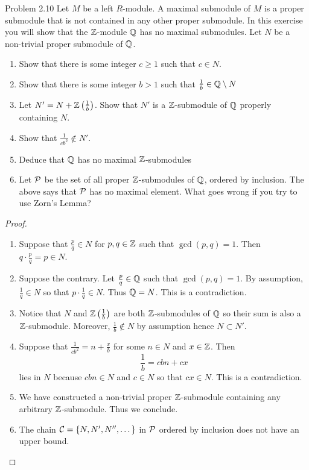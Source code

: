 \documentclass[a4paper]{article}
\begin{document}
\begin{ex}{Problem 2.10}{} Let $M$ be a left $R$-module. A maximal submodule of $M$ is a proper submodule that is not contained in any other proper submodule. In this exercise you will show that the $\mathbb{Z}$-module $\mathbb{Q}$ has no maximal submodules. Let $N$ be a non-trivial proper submodule of $\mathbb{Q}$. 
\begin{enumerate}
\item Show that there is some integer $c\geq 1$ such that $c\in N$.
\item Show that there is some integer $b>1$ such that $\frac{1}{b}\in\mathbb{Q}\setminus N$
\item Let $N'=N+\mathbb{Z}\left(\frac{1}{b}\right)$. Show that $N'$ is a $\mathbb{Z}$-submodule of $\mathbb{Q}$ properly containing $N$. 
\item Show that $\frac{1}{cb^2}\notin N'$. 
\item Deduce that $\mathbb{Q}$ has no maximal $\mathbb{Z}$-submodules
\item Let $\mathcal{P}$ be the set of all proper $\mathbb{Z}$-submodules of $\mathbb{Q}$, ordered by inclusion. The above says that $\mathcal{P}$ has no maximal element. What goes wrong if you try to use Zorn's Lemma?
\end{enumerate} \tcbline
\begin{proof}~\\
\begin{enumerate}
\item Suppose that $\frac{p}{q}\in N$ for $p,q\in\mathbb{Z}$ such that $\gcd(p,q)=1$. Then $q\cdot\frac{p}{q}=p\in N$. 
\item Suppose the contrary. Let $\frac{p}{q}\in\mathbb{Q}$ such that $\gcd(p,q)=1$. By assumption, $\frac{1}{q}\in N$ so that $p\cdot\frac{1}{q}\in N$. Thus $\mathbb{Q}=N$. This is a contradiction. 
\item Notice that $N$ and $\mathbb{Z}\left(\frac{1}{b}\right)$ are both $\mathbb{Z}$-submodules of $\mathbb{Q}$ so their sum is also a $\mathbb{Z}$-submodule. Moreover, $\frac{1}{b}\notin N$ by assumption hence $N\subset N'$. 
\item Suppose that $\frac{1}{cb^2}=n+\frac{x}{b}$ for some $n\in N$ and $x\in\mathbb{Z}$. Then $$\frac{1}{b}=cbn+cx$$ lies in $N$ because $cbn\in N$ and $c\in N$ so that $cx\in N$. This is a contradiction. 
\item We have constructed a non-trivial proper $\mathbb{Z}$-submodule containing any arbitrary $\mathbb{Z}$-submodule. Thus we conclude. 
\item The chain $\mathcal{C}=\{N,N',N'',\dots\}$ in $\mathcal{P}$ ordered by inclusion does not have an upper bound. 
\end{enumerate}
\end{proof}
\end{ex}
\end{document}
